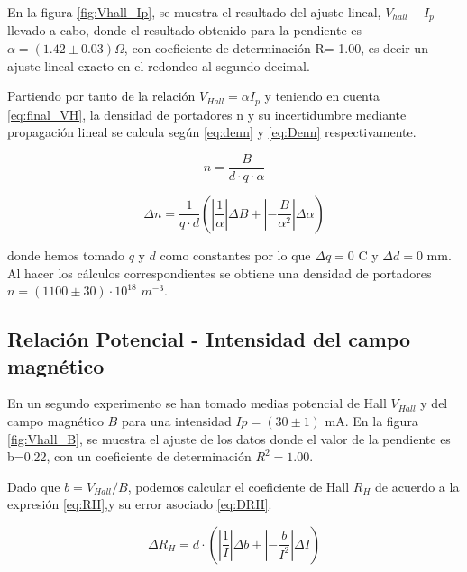 	En la figura \ref{fig:Vhall_Ip}, se muestra el resultado del ajuste lineal, $V_{hall}-I_p$ llevado a cabo, donde el resultado obtenido para la pendiente es $\alpha=(1.42\pm 0.03)\Omega$, con coeficiente de determinación R= 1.00, es decir un ajuste lineal exacto en el redondeo al segundo decimal.
	
	\vspace{\baselineskip}
	
	Partiendo por tanto de la relación $V_{Hall} = \alpha I_p$ y teniendo en cuenta \ref{eq:final_VH}, la densidad de portadores n y su incertidumbre mediante propagación lineal se calcula según \ref{eq:denn} y \ref{eq:Denn} respectivamente.
	
	\begin{equation} \label{eq:denn}
		 n = \frac{B}{d\cdot q \cdot \alpha} 
	\end{equation}
	
	
	\begin{equation} \label{eq:Denn}
		\Delta n = \frac{1}{q\cdot d}\left(\left|\frac{1}{\alpha}\right|\Delta B +\left|-\frac{B}{\alpha^2}\right|\Delta \alpha \right)
	\end{equation}
	
	\vspace{\baselineskip}
	
	donde hemos tomado $q$ y $d$ como constantes por lo que $\Delta q =0 $ C y  $\Delta d = 0$ mm. Al hacer los cálculos correspondientes se obtiene una densidad de portadores $n=(1100\pm30)\cdot 10^{18}$ $m^{-3}$.
		

	
	\subsection{Relación Potencial - Intensidad del campo magnético}	
	
	En un segundo experimento se han tomado medias potencial de Hall $V_{Hall}$ y del campo magnético $B$ para una intensidad $Ip=(30\pm1)$ mA. En la figura \ref{fig:Vhall_B}, se muestra el ajuste de los datos donde el valor de la pendiente es b=0.22, con un coeficiente de determinación $R^2=1.00$. 
	
	\vspace{\baselineskip}
	
	Dado que $b=V_{Hall}/B$, podemos calcular el coeficiente de Hall $R_H$ de acuerdo a la expresión \ref{eq:RH},y su error asociado \ref{eq:DRH}.
	
	\begin{equation} \label{eq:DRH}
		\Delta R_H = d\cdot\left(\left|\frac{1}{I}\right|\Delta b +\left|-\frac{b}{I^2}\right|\Delta I \right)
	\end{equation}
	
